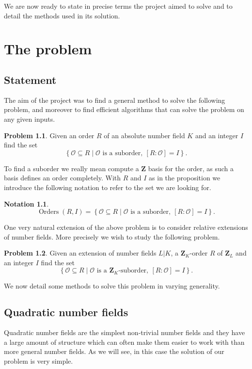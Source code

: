 \documentclass[a4paper,abstracton]{scrreprt}
\theoremstyle{definition}
\newtheorem{prob}{Problem}
\newtheorem{nota}{Notation}
\newcommand{\ZZ}{\mathbf{Z}}
\renewcommand{\O}{\mathcal{O}}
\DeclareMathOperator{\Orders}{Orders}
\begin{document}
\minisec{}
We are now ready to state in precise terms the project aimed to solve and to detail the methods used in its solution.

\chapter{The problem}
\label{chap:prob}
\section{Statement}
\label{sec:statements}

The aim of the project was to find a general method to solve the following problem, and moreover to find efficient algorithms that can solve the problem on any given inputs.

\begin{prob}
Given an order $R$ of an absolute number field $K$ and an integer $I$ find the set
\[\left\{ \O\subseteq R \mid \O\text{ is a suborder},\ [R\colon\O] = I\right\}.\]
\end{prob}

To find a suborder we really mean compute a $\ZZ$ basis for the order, as such a basis defines an order completely.
With $R$ and $I$ as in the proposition we introduce the following notation to refer to the set we are looking for.

\begin{nota}
\[\Orders(R,I) = \left\{ \O\subseteq R \mid \O\text{ is a suborder},\ [R\colon\O] = I\right\}.\]
\end{nota}

\minisec{}
One very natural extension of the above problem is to consider relative extensions of number fields.
More precisely we wish to study the following problem.

\begin{prob} %
Given an extension of number fields $L|K$, a $\ZZ_K$-order $R$ of $\ZZ_L$ and an integer $I$ find the set
\[\left\{ \O\subseteq R \mid \O\text{ is a $\ZZ_K$-suborder},\ [R\colon\O] = I\right\}.\]
\end{prob}

We now detail some methods to solve this problem in varying generality.

\section{Quadratic number fields}

Quadratic number fields are the simplest non-trivial number fields and they have a large amount of structure which can often make them easier to work with than more general number fields.
As we will see, in this case the solution of our problem is very simple.
\end{document}
